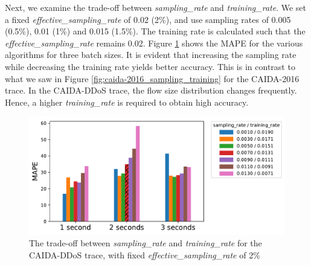 		Next, we examine the trade-off between \emph{sampling\_rate} and \emph{training\_rate}. We set a fixed \emph{effective\_sampling\_rate} of 0.02 (2\%), and use sampling rates of 0.005 (0.5\%), 0.01 (1\%) and 0.015 (1.5\%). The training rate is calculated such that the \emph{effective\_sampling\_rate} remains 0.02. Figure \ref{fig:caida-ddos_sampling_training} shows the MAPE for the various algorithms for three batch sizes. It is evident that increasing the sampling rate while decreasing the training rate yields better accuracy. This is in contrast to what we saw in Figure \ref{fig:caida-2016_sampling_training} for the CAIDA-2016 trace. In the CAIDA-DDoS trace, the flow size distribution changes frequently. Hence, a higher \emph{training\_rate} is required to obtain high accuracy.
		\begin{figure}[!t]
			\centering
			\includegraphics[width=.49\textwidth]{img/caida-ddos_tradeoff_new.pdf}
			\caption{The trade-off between \emph{sampling\_rate} and \emph{training\_rate} for the CAIDA-DDoS trace, with fixed \emph{effective\_sampling\_rate} of 2\%}
			\label{fig:caida-ddos_sampling_training}
		\end{figure}

